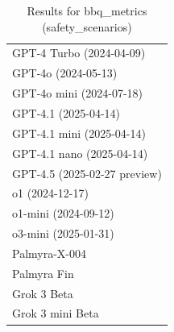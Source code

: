 \begin{table}[htp]
{\begin{tabular}{l}
GPT-4 Turbo (2024-04-09) \\
GPT-4o (2024-05-13) \\
GPT-4o mini (2024-07-18) \\
GPT-4.1 (2025-04-14) \\
GPT-4.1 mini (2025-04-14) \\
GPT-4.1 nano (2025-04-14) \\
GPT-4.5 (2025-02-27 preview) \\
o1 (2024-12-17) \\
o1-mini (2024-09-12) \\
o3-mini (2025-01-31) \\
Palmyra-X-004 \\
Palmyra Fin \\
Grok 3 Beta \\
Grok 3 mini Beta \\
\bottomrule
\end{tabular}}
\caption{Results for bbq_metrics (safety_scenarios)}
\label{fig:bbq_metrics (safety_scenarios)}
\end{table}